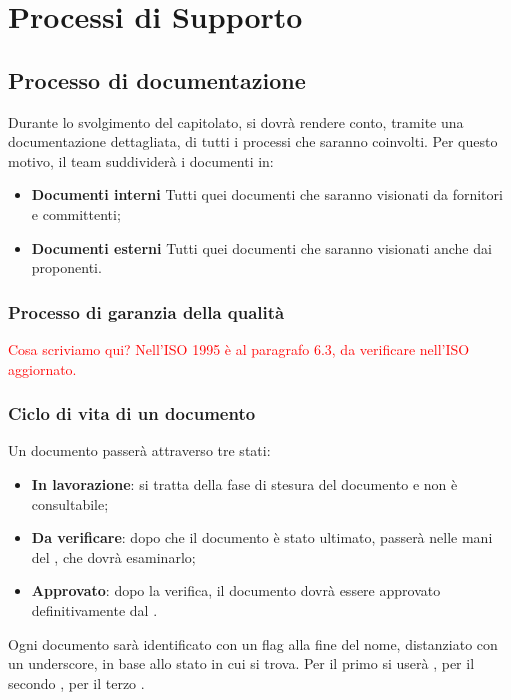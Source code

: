 \newpage
\section{Processi di Supporto}
\subsection{Processo di documentazione}
Durante lo svolgimento del capitolato, si dovrà rendere conto, tramite una documentazione dettagliata, di tutti i processi che saranno coinvolti. 
Per questo motivo, il team suddividerà i documenti in:
\begin{itemize}
	\item \textbf{Documenti interni}
	\newline Tutti quei documenti che saranno visionati da fornitori e committenti;
	\item \textbf{Documenti esterni}
	\newline Tutti quei documenti che saranno visionati anche dai proponenti.
	
\end{itemize}
	\subsubsection{Processo di garanzia della qualità}
	\textcolor{red}{Cosa scriviamo qui? Nell'ISO 1995 è al paragrafo 6.3, da verificare nell'ISO aggiornato.}
	
	\subsubsection{Ciclo di vita di un documento}
	Un documento passerà attraverso tre stati:
	\begin{itemize}
		\item \textbf{In lavorazione}:
		si tratta della fase di stesura del documento e non è consultabile;
		\item \textbf{Da verificare}:
		dopo che il documento è stato ultimato, passerà nelle mani del \ver, che dovrà esaminarlo;
		\item \textbf{Approvato}:
		dopo la verifica, il documento dovrà essere approvato definitivamente dal \RdP.
	\end{itemize}
	Ogni documento sarà identificato con un flag alla fine del nome, distanziato con un underscore, in base allo stato in cui si trova. 
	Per il primo si userà \emph{}, per il secondo \emph{}, per il terzo \emph{}.
	
